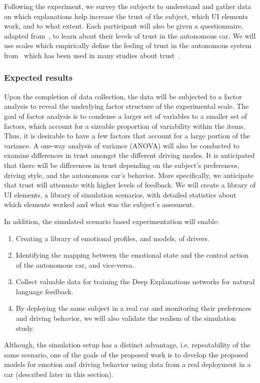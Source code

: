 Following the experiment, we survey the subjects to understand and gather data on which explanations help increase the trust of the subject, which UI elements work, and to what extent.
Each participant will also be given a questionnaire, adapted from~\cite{merritt2013trust}, to learn about their levels of trust in the autonomous car. 
We will use scales which empirically define the feeling of trust in the autonomous system from~\cite{jian2000foundations} which has been used in many studies about trust~\cite{hoff2015trust}.

\subsubsection{Expected results} 
Upon the completion of data collection, the data will be subjected to a factor analysis to reveal the underlying factor structure of the experimental scale. 
The goal of factor analysis is to condense a larger set of variables to a smaller set of factors, which account for a sizeable proportion of variability within the items. Thus, it is desirable to have a few factors that account for a large portion of the variance. 
A one-way analysis of variance (ANOVA) will also be conducted to examine differences in trust amongst the different driving modes. 
It is anticipated that there will be differences in trust depending on the subject's preferences, driving style, and the autonomous car's behavior. 
More specifically, we anticipate that trust will attenuate with higher levels of feedback. We will create a library of UI elements, a library of simulation scenarios, with detailed statistics about which elements worked and what was the subject's assesment.

In addition, the simulated scenario based experimentation will enable:
\begin{enumerate}[itemsep=0pt,parsep=0pt,topsep=4pt,leftmargin=0.4in]
    \item Creating a library of emotional profiles, and models, of drivers.
    \item Identifying the mapping between the emotional state and the control action of the autonomous car, and vice-versa.
    \item Collect valuable data for training the Deep Explanations networks for natural language feedback.
    \item By deploying the same subject in a real car and monitoring their preferences and driving behavior, we will also validate the realism of the simulation study. 
\end{enumerate}

Although, the simulation setup has a distinct advantage, i.e. repeatability of the same scenario, one of the goals of the proposed work is to develop the proposed models for emotion and driving behavior using data from a real deployment in a car (described later in this section). 


